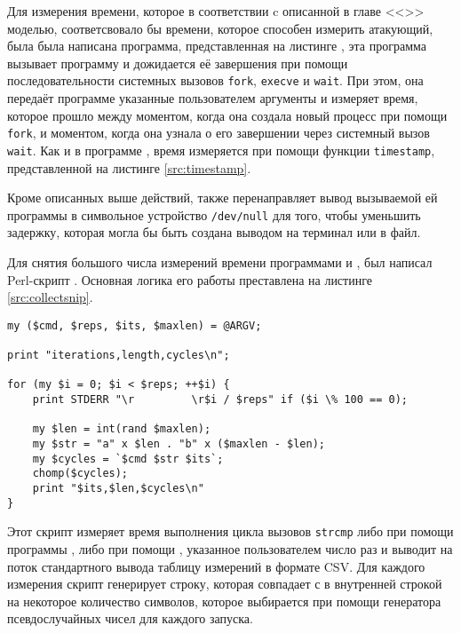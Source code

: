 Для измерения времени, которое в соответствии c описанной в главе
<<>> моделью, соответсвовало бы времени, которое способен
измерить атакующий, была была написана программа, представленная на листинге
, эта программа вызывает программу 
и дожидается её завершения при помощи последовательности системных вызовов
\texttt{fork}, \texttt{execve} и \texttt{wait}. При этом, она передаёт программе
 указанные пользователем аргументы и измеряет время, которое
прошло между моментом, когда она создала новый процесс при помощи \texttt{fork},
и моментом, когда она узнала о его завершении через системный вызов
\texttt{wait}. Как и в программе , время измеряется при помощи
функции \texttt{timestamp}, представленной на листинге \ref{src:timestamp}.

Кроме описанных выше действий,  также перенаправляет
вывод вызываемой ей программы в символьное устройство \texttt{/dev/null} для
того, чтобы уменьшить задержку, которая могла бы быть создана выводом на терминал
или в файл.

Для снятия большого числа измерений времени программами  и
, был написал Perl-скрипт . Основная
логика его работы преставлена на листинге \ref{src:collectsnip}.

\nopagebreak

\begin{lstlisting}[caption=Фрагмент скрипта \texttt{collect.pl}, label=src:collectsnip]
my ($cmd, $reps, $its, $maxlen) = @ARGV;

print "iterations,length,cycles\n";

for (my $i = 0; $i < $reps; ++$i) {
	print STDERR "\r         \r$i / $reps" if ($i \% 100 == 0);

	my $len = int(rand $maxlen);
	my $str = "a" x $len . "b" x ($maxlen - $len);
	my $cycles = `$cmd $str $its`;
	chomp($cycles);
	print "$its,$len,$cycles\n"
}
\end{lstlisting}

Этот скрипт измеряет время выполнения цикла вызовов \texttt{strcmp} либо при
помощи программы , либо при помощи ,
указанное пользователем число раз и выводит на поток стандартного вывода таблицу
измерений в формате CSV. Для каждого измерения скрипт генерирует строку, которая
совпадает с в внутренней строкой  на некоторое количество
символов, которое выбирается при помощи генератора псевдослучайных чисел для
каждого запуска.

\clearpage
